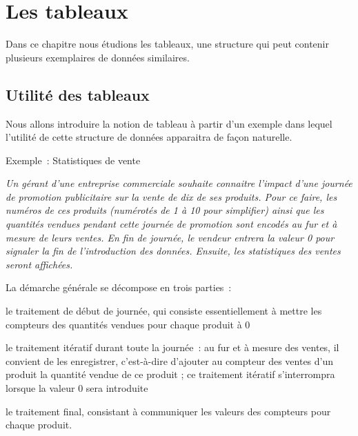 \chapter{Les tableaux}

	Dans ce chapitre nous étudions les tableaux, 
	une structure qui peut contenir 
	plusieurs exemplaires de données similaires.

\section{Utilité des tableaux}

	Nous allons introduire la notion de tableau à partir d’un exemple 
	dans lequel l’utilité de cette structure de données 
	apparaitra de façon naturelle.

	\begin{Emphase}{Exemple~: Statistiques de vente}

		{\itshape
		Un gérant d’une entreprise commerciale souhaite connaitre l’impact d’une
		journée de promotion publicitaire sur la vente de dix de ses produits.
		Pour ce faire, les numéros de ces produits (numérotés de 1 à 10 pour
		simplifier) ainsi que les quantités vendues pendant cette journée de
		promotion sont encodés au fur et à mesure de leurs ventes. En fin de
		journée, le vendeur entrera la valeur 0 pour signaler la fin de
		l’introduction des données. Ensuite, les statistiques des ventes seront
		affichées.}

	\end{Emphase}

	La démarche générale se décompose en trois parties~:

	\begin{liste}
	\item
		le traitement de début de journée, qui consiste essentiellement à mettre
		les compteurs des quantités vendues pour chaque produit à 0
	\item
		le traitement itératif durant toute la journée~: 
		au fur et à mesure des ventes, 
		il convient de les enregistrer, 
		c’est-à-dire d’ajouter au compteur des ventes d’un produit 
		la quantité vendue de ce produit ; 
		ce traitement itératif s’interrompra lorsque la valeur 0 sera introduite
	\item
		le traitement final, consistant à communiquer les valeurs des compteurs
		pour chaque produit.
	\end{liste}

